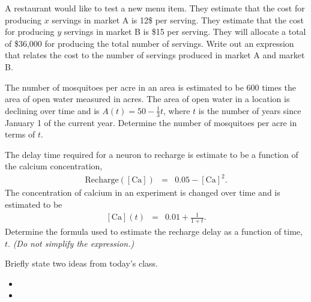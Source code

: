 
\begin{problem}
\item A restaurant would like to test a new menu item. They estimate
  that the cost for producing $x$ servings in market A is 12\$ per
  serving. They estimate that the cost for producing $y$ servings in
  market B is \$15 per serving.  They will allocate a total of
  \$36,000 for producing the total number of servings. Write out an
  expression that relates the cost to the number of servings produced
  in market A and market B.  
  \vfill
\item The number of mosquitoes per acre in an area is estimated to be
  600 times the area of open water measured in acres. The area of open
  water in a location is declining over time and is
  $A(t)=50-\frac{1}{3}t$, where $t$ is the number of years since
  January 1 of the current year. Determine the number of mosquitoes
  per acre in terms of $t$.
  \vfill
\item The delay time required for a neuron to recharge is estimate to
  be a function of the calcium concentration,
  \begin{eqnarray*}
    \mathrm{Recharge([Ca])} & = & 0.05-\mathrm{[Ca]}^2.
  \end{eqnarray*}
  The concentration of calcium in an experiment is changed over time
  and is estimated to be 
  \begin{eqnarray*}
    \mathrm{[Ca]}(t) & = & 0.01+\frac{1}{1+t}.
  \end{eqnarray*}
  Determine the formula used to estimate the recharge delay as a
  function of time, $t$. \textit{(Do not simplify the expression.)}
  \vfill
\end{problem}


\begin{problem}
\item 
  \begin{subproblem}
    \item
  \end{subproblem}
\end{problem}

\postClass

\begin{problem}
\item Briefly state two ideas from today's class.
  \begin{itemize}
  \item 
  \item 
  \end{itemize}
\item 
  \begin{subproblem}
    \item
  \end{subproblem}
\end{problem}



